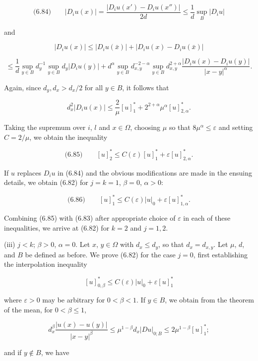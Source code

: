 \[
\text{(6.84)}\qquad
\lvert D_{i}u(x)\rvert=\frac{\lvert D_i u(x')-D_i u(x'')\rvert}{2d}\le \frac{1}{d}\sup_B \lvert D_i u\rvert
\]

and

\[
\lvert D_i u(x)\rvert\le \lvert D_i u(\bar{x})\rvert+\lvert D_i u(x)-D_i u(\bar{x})\rvert
\]

\[
\le \frac{1}{d}\sup_{y\in B} d_y^{-1}\sup_{y\in B} d_y\lvert D_i u(y)\rvert
+ d^{\alpha}\sup_{y\in B} d_{x,y}^{-2-\alpha}\sup_{y\in B} d_{x,y}^{2+\alpha}\frac{\lvert D_i u(x)-D_i u(y)\rvert}{\lvert x-y\rvert^{\alpha}}.
\]

Again, since $d_y,d_x > d_x/2$ for all $y\in B$, it follows that

\[
d_x^2\lvert D_i u(x)\rvert\le \frac{2}{\mu}[u]_1^*+2^{2+\alpha}\mu^{\alpha}[u]_{2,\alpha}^*.
\]


Taking the supremum over $i$, $l$ and $x\in\Omega$, choosing $\mu$ so that $8\mu^{\alpha}\le \varepsilon$ and setting
$C=2/\mu$, we obtain the inequality

\[
\text{(6.85)}\qquad [u]^*_{2}\le C(\varepsilon)[u]^*_{1}+\varepsilon [u]^*_{2,\alpha}.
\]

If $u$ replaces $D_i u$ in (6.84) and the obvious modifications are made in the ensuing details, we obtain (6.82) for $j=k=1$, $\beta=0$, $\alpha>0$:

\[
\text{(6.86)}\qquad [u]^*_{1}\le C(\varepsilon)\lvert u\rvert_{0}+\varepsilon [u]^*_{1,\alpha}.
\]

Combining (6.85) with (6.83) after appropriate choice of $\varepsilon$ in each of these inequalities, we arrive at (6.82) for $k=2$ and $j=1,2$.

(iii) $j<k$; $\beta>0$, $\alpha=0$. Let $x$, $y\in\Omega$ with $d_x\le d_y$, so that $d_x=d_{x,y}$. Let $\mu$, $d$, and $B$ be defined as before. We prove (6.82) for the case $j=0$, first establishing the interpolation inequality

\[
[u]^*_{0,\beta}\le C(\varepsilon)\lvert u\rvert_{0}+\varepsilon [u]^*_{1}
\]

where $\varepsilon>0$ may be arbitrary for $0<\beta<1$. If $y\in B$, we obtain from the theorem of the mean, for $0<\beta\le 1$,

\[
d_x^{\beta}\frac{\lvert u(x)-u(y)\rvert}{\lvert x-y\rvert^{\beta}}
\le \mu^{1-\beta}d_x\lvert Du\rvert_{0;B}\le 2\mu^{1-\beta}[u]^*_{1};
\]

and if $y\notin B$, we have

